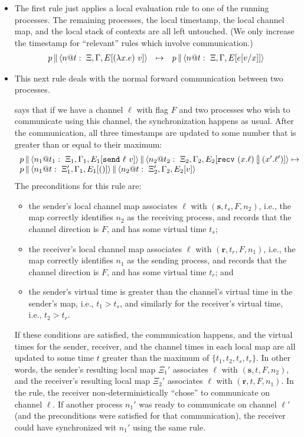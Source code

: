 \documentclass{article}
\begin{document}
\begin{itemize}
\item The first rule just applies a local evaluation rule to one of the
  running processes. The remaining processes, the local timestamp, the local
  channel map, and the local stack of contexts are all left untouched. (We
  only increase the timestamp for ``relevant'' rules which involve
  communication.)
\[\begin{array}{rcl}
  \parc{p}{\proc{n}{\Gamma}{\Xi}{E[(\lambda x.e)~v]}{t}} &\mapsto& 
  \parc{p}{\proc{n}{\Gamma}{\Xi}{E[e[v/x]]}{t}}
\end{array}\]

\item This next rule deals with the normal forward communication between two
  processes. 

says that if we have a channel $\ell$ with flag $F$ and two
  processes who wish to communicate using this channel, the synchronization
  happens as usual. After the communication, all three timestamps are updated
  to some number that is greater than or equal to their maximum:
\[\begin{array}{l}
  \parc{p}
  {\parc{\proc{n_1}{\Gamma_1}{\Xi_1}{E_1[\send{\ell}{v}]}{t_1}}
        {\proc{n_2}{\Gamma_2}{\Xi_2}{E_2[\recv{x}{\ell}{x'}{\ell'}]}{t_2}}}
  \mapsto \\
  \parc{p}{\parc{\proc{n_1}{\Gamma_1}{\Xi_1'}{E_1[()]}{t}}
    {\proc{n_2}{\Gamma_2}{\Xi_2'}{E_2[v]}{t}}}
\end{array}\]
The preconditions for this rule are: 
\begin{itemize}
\item the sender's local channel map associates $\ell$ with
  $(\textbf{s},t_s,F,n_2)$, i.e., the map correctly identifies $n_2$ as the
  receiving process, and records that the channel direction is $F$, and has
  some virtual time $t_s$;
\item the receiver's local channel map associates $\ell$ with
  $(\textbf{r},t_r,F,n_1)$, i.e., the map correctly identifies $n_1$ as the
  sending process, and records that the channel direction is $F$, and has
  some virtual time $t_r$; and
\item the sender's virtual time is greater than the channel's virtual time in
  the sender's map, i.e., $t_1 > t_s$, and similarly for the receiver's
  virtual time, i.e., $t_2 > t_r$.
\end{itemize}
If these conditions are satisfied, the communication happens, and the virtual
times for the sender, receiver, and the channel times in each local map are
all updated to some time $t$ greater than the maximum of
$\{t_1,t_2,t_s,t_r\}$. In other words, the sender's resulting local map
$\Xi_1'$ associates $\ell$ with $(\textbf{s},t,F,n_2)$, and the receiver's
resulting local map $\Xi_2'$ associates $\ell$ with
$(\textbf{r},t,F,n_1)$. In the rule, the receiver non-deterministically
``chose'' to communicate on channel $\ell$. If another process $n_1'$ was
ready to communicate on channel $\ell'$ (and the preconditions were satisfied
for that communication), the receiver could have synchronized wit $n_1'$
using the same rule.


\end{itemize}
\end{document}
